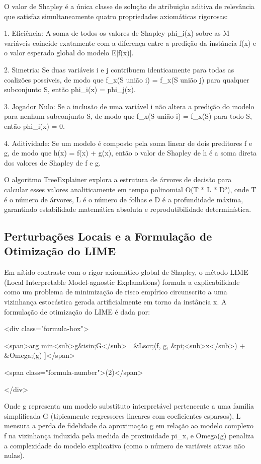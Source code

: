 \documentclass[12pt,a4paper]{article}
\begin{document}
O valor de Shapley é a única classe de solução de atribuição aditiva de relevância que satisfaz simultaneamente quatro propriedades axiomáticas rigorosas:

1. Eficiência: A soma de todos os valores de Shapley phi\_i(x) sobre as M variáveis coincide exatamente com a diferença entre a predição da instância f(x) e o valor esperado global do modelo E[f(x)].

2. Simetria: Se duas variáveis i e j contribuem identicamente para todas as coalizões possíveis, de modo que f\_x(S união {i}) = f\_x(S união {j}) para qualquer subconjunto S, então phi\_i(x) = phi\_j(x).

3. Jogador Nulo: Se a inclusão de uma variável i não altera a predição do modelo para nenhum subconjunto S, de modo que f\_x(S união {i}) = f\_x(S) para todo S, então phi\_i(x) = 0.

4. Aditividade: Se um modelo é composto pela soma linear de dois preditores f e g, de modo que h(x) = f(x) + g(x), então o valor de Shapley de h é a soma direta dos valores de Shapley de f e g.

O algoritmo TreeExplainer explora a estrutura de árvores de decisão para calcular esses valores analiticamente em tempo polinomial O(T * L * D²), onde T é o número de árvores, L é o número de folhas e D é a profundidade máxima, garantindo estabilidade matemática absoluta e reprodutibilidade determinística.


\subsection{Perturbações Locais e a Formulação de Otimização do LIME}

Em nítido contraste com o rigor axiomático global de Shapley, o método LIME (Local Interpretable Model-agnostic Explanations) formula a explicabilidade como um problema de minimização de risco empírico circunscrito a uma vizinhança estocástica gerada artificialmente em torno da instância x. A formulação de otimização do LIME é dada por:

<div class="formula-box">

<span>arg min<sub>g\&isin;G</sub> [ \&Lscr;(f, g, \&pi;<sub>x</sub>) + \&Omega;(g) ]</span>

<span class="formula-number">(2)</span>

</div>

Onde g representa um modelo substituto interpretável pertencente a uma família simplificada G (tipicamente regressores lineares com coeficientes esparsos), L mensura a perda de fidelidade da aproximação g em relação ao modelo complexo f na vizinhança induzida pela medida de proximidade pi\_x, e Omega(g) penaliza a complexidade do modelo explicativo (como o número de variáveis ativas não nulas).
\end{document}
